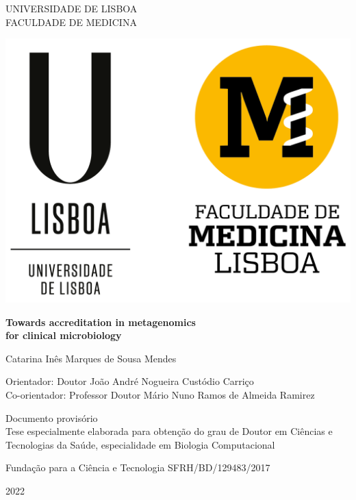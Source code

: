 \begin{titlepage}
    \begin{center}
        UNIVERSIDADE DE LISBOA\\
        FACULDADE DE MEDICINA
        
        \vspace{1cm}
        
        {\includegraphics{figures/cover/UL+FMUL-VerticalPositivo.png}}
        
        \vspace{1cm}

        \huge
        \textbf{Towards accreditation in metagenomics \\[1ex] for clinical microbiology}
        \normalsize
        
        \vspace{1cm}
        
        \large
        Catarina Inês Marques de Sousa Mendes
        \normalsize
        
        \vspace{1cm}
        
        Orientador: Doutor João André Nogueira Custódio Carriço\\
        Co-orientador: Professor Doutor Mário Nuno Ramos de Almeida Ramirez
        
        \vfill
        
        Documento provisório\\
        Tese especialmente elaborada para obtenção do grau de Doutor em Ciências e Tecnologias da Saúde, especialidade em Biologia Computacional\\
        
        \vspace{0.8cm}
        
        Fundação para a Ciência e Tecnologia SFRH/BD/129483/2017
        
        \vspace{0.8cm}
        
        2022
    \end{center}
\end{titlepage}